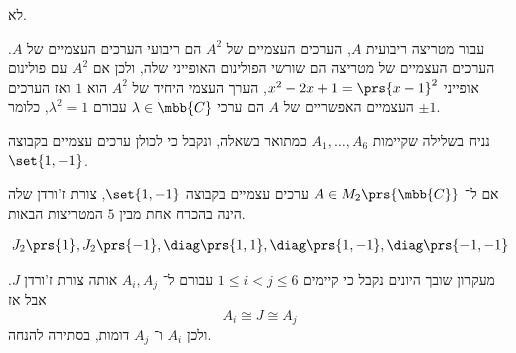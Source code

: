 \documentclass[a4paper,10pt,twoside,openany]{article}
\begin{document}
\begin{solution}
לא.

עבור מטריצה ריבועית
$A$,
הערכים העצמיים של
$A^2$
הם ריבועי הערכים העצמיים של
$A$.
הערכים העצמיים של מטריצה הם שורשי הפולינום האופייני שלה, ולכן אם
$A^2$
עם פולינום אופייני
$x^2 -2x + 1 = \prs{x-1}^2$,
הערך העצמי היחיד של
$A^2$
הוא
$1$
ואז הערכים העצמיים האפשריים של
$A$
הם ערכי
$\lambda \in \mbb{C}$
עבורם
$\lambda^2 = 1$,
כלומר
$\pm 1$.

נניח בשלילה שקיימות
$A_1, \ldots, A_6$
כמתואר בשאלה, ונקבל כי לכולן ערכים עצמיים בקבוצה
$\set{1, -1}$.

אם ל־%
$A \in M_2\prs{\mbb{C}}$
ערכים עצמיים בקבוצה
$\set{1, -1}$,
צורת ז'ורדן שלה הינה בהכרח אחת מבין $5$ המטריצות הבאות.

\begin{align*}
J_2\prs{1}, J_2\prs{-1}, \diag\prs{1, 1}, \diag\prs{1, -1}, \diag\prs{-1, -1}
\end{align*}

מעקרון שובך היונים נקבל כי קיימים
$1 \leq i < j \leq 6$
עבורם ל־%
$A_i, A_j$
אותה צורת ז'ורדן
$J$.
אבל אז
\[A_i \cong J \cong A_j\]
ולכן
$A_i$
ו־%
$A_j$
דומות, בסתירה להנחה.
\end{solution}
\end{document}
